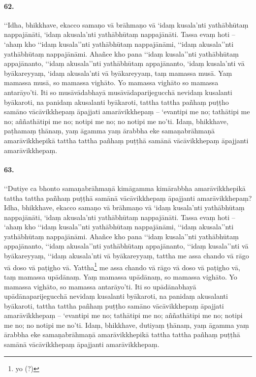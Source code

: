 \paragraph{62.}
‘‘Idha, bhikkhave, ekacco samaṇo vā brāhmaṇo vā ‘idaṃ kusala’nti yathābhūtaṃ nappajānāti, ‘idaṃ akusala’nti yathābhūtaṃ nappajānāti. Tassa evaṃ hoti – ‘ahaṃ kho ‘‘idaṃ kusala’’nti yathābhūtaṃ nappajānāmi, ‘‘idaṃ akusala’’nti yathābhūtaṃ nappajānāmi. Ahañce kho pana ‘‘idaṃ kusala’’nti yathābhūtaṃ appajānanto, ‘‘idaṃ akusala’’nti yathābhūtaṃ appajānanto, ‘idaṃ kusala’nti vā byākareyyaṃ, ‘idaṃ akusala’nti vā byākareyyaṃ, taṃ mamassa musā. Yaṃ mamassa musā, so mamassa vighāto. Yo mamassa vighāto so mamassa antarāyo’ti. Iti so musāvādabhayā musāvādaparijegucchā nevidaṃ kusalanti byākaroti, na panidaṃ akusalanti byākaroti, tattha tattha pañhaṃ puṭṭho samāno vācāvikkhepaṃ āpajjati amarāvikkhepaṃ – ‘evantipi me no; tathātipi me no; aññathātipi me no; notipi me no; no notipi me no’ti. Idaṃ, bhikkhave, paṭhamaṃ ṭhānaṃ, yaṃ āgamma yaṃ ārabbha eke samaṇabrāhmaṇā amarāvikkhepikā tattha tattha pañhaṃ puṭṭhā samānā vācāvikkhepaṃ āpajjanti amarāvikkhepaṃ.

\paragraph{63.}
‘‘Dutiye ca bhonto samaṇabrāhmaṇā kimāgamma kimārabbha amarāvikkhepikā tattha tattha pañhaṃ puṭṭhā samānā vācāvikkhepaṃ āpajjanti amarāvikkhepaṃ? Idha, bhikkhave, ekacco samaṇo vā brāhmaṇo vā ‘idaṃ kusala’nti yathābhūtaṃ nappajānāti, ‘idaṃ akusala’nti yathābhūtaṃ nappajānāti. Tassa evaṃ hoti – ‘ahaṃ kho ‘‘idaṃ kusala’’nti yathābhūtaṃ nappajānāmi, ‘‘idaṃ akusala’’nti yathābhūtaṃ nappajānāmi. Ahañce kho pana ‘‘idaṃ kusala’’nti yathābhūtaṃ appajānanto, ‘‘idaṃ akusala’’nti yathābhūtaṃ appajānanto, ‘‘idaṃ kusala’’nti vā byākareyyaṃ, ‘‘idaṃ akusala’nti vā byākareyyaṃ, tattha me assa chando vā rāgo vā doso vā paṭigho vā. Yattha\footnote{yo (?)} me assa chando vā rāgo vā doso vā paṭigho vā, taṃ mamassa upādānaṃ. Yaṃ mamassa upādānaṃ, so mamassa vighāto. Yo mamassa vighāto, so mamassa antarāyo’ti. Iti so upādānabhayā upādānaparijegucchā nevidaṃ kusalanti byākaroti, na panidaṃ akusalanti byākaroti, tattha tattha pañhaṃ puṭṭho samāno vācāvikkhepaṃ āpajjati amarāvikkhepaṃ – ‘evantipi me no; tathātipi me no; aññathātipi me no; notipi me no; no notipi me no’ti. Idaṃ, bhikkhave, dutiyaṃ ṭhānaṃ, yaṃ āgamma yaṃ ārabbha eke samaṇabrāhmaṇā amarāvikkhepikā tattha tattha pañhaṃ puṭṭhā samānā vācāvikkhepaṃ āpajjanti amarāvikkhepaṃ.

